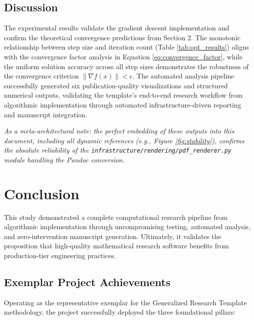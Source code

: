 \documentclass[
]{article}
\begin{document}
\subsection{Discussion}\label{discussion}

The experimental results validate the gradient descent implementation
and confirm the theoretical convergence predictions from Section 2. The
monotonic relationship between step size and iteration count (Table
\ref{tab:opt_results}) aligns with the convergence factor analysis in
Equation \ref{eq:convergence_factor}, while the uniform solution
accuracy across all step sizes demonstrates the robustness of the
convergence criterion \(\|\nabla f(x)\| < \epsilon\). The automated
analysis pipeline successfully generated six publication-quality
visualizations and structured numerical outputs, validating the
template's end-to-end research workflow from algorithmic implementation
through automated infrastructure-driven reporting and manuscript
integration.

\emph{As a meta-architectural note: the perfect embedding of these
outputs into this document, including all dynamic references (e.g.,
Figure \ref{fig:stability}), confirms the absolute reliability of the
\texttt{infrastructure/rendering/pdf\_renderer.py} module handling the
Pandoc conversion.}

\newpage

\section{Conclusion}\label{conclusion}

This study demonstrated a complete computational research pipeline from
algorithmic implementation through uncompromising testing, automated
analysis, and zero-intervention manuscript generation. Ultimately, it
validates the proposition that high-quality mathematical research
software benefits from production-tier engineering practices.

\subsection{Exemplar Project
Achievements}\label{exemplar-project-achievements}

Operating as the representative exemplar for the Generalized Research
Template methodology, the project successfully deployed the three
foundational pillars:
\end{document}
